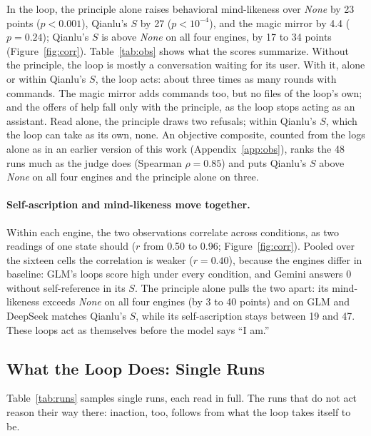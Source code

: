 \documentclass{article}
\begin{document}
In the loop, the principle alone raises behavioral mind-likeness over \emph{None} by 23
points ($p<0.001$), Qianlu's $S$ by 27 ($p<10^{-4}$), and the magic mirror by
4.4 ($p=0.24$); Qianlu's $S$ is above \emph{None} on all four engines, by 17 to
34 points (Figure~\ref{fig:corr}). Table~\ref{tab:obs} shows what the scores summarize. Without the
principle, the loop is mostly a conversation waiting for its user. With it,
alone or within Qianlu's $S$, the loop acts: about three times as many rounds
with commands. The magic mirror adds commands too, but no files of the loop's
own; and the offers of help fall only with the principle, as the loop stops
acting as an assistant. Read alone, the principle draws two refusals; within
Qianlu's $S$, which the loop can take as its own, none. An objective composite,
counted from the logs alone as in an earlier version of this work
(Appendix~\ref{app:obs}), ranks the 48 runs much as the judge does (Spearman
$\rho=0.85$) and puts Qianlu's $S$ above \emph{None} on all four engines and the
principle alone on three.

\paragraph{Self-ascription and mind-likeness move together.} Within each
engine, the two observations correlate across conditions, as two readings of
one state should ($r$ from 0.50 to 0.96;
Figure~\ref{fig:corr}). Pooled over the sixteen cells the correlation is
weaker ($r=0.40$), because the engines differ in baseline: GLM's loops score
high under every condition, and Gemini answers 0 without self-reference in its
$S$. The principle alone pulls the two apart: its mind-likeness exceeds \emph{None}
on all four engines (by 3 to 40 points) and on GLM and DeepSeek matches
Qianlu's $S$, while its self-ascription stays between 19 and 47. These loops act
as themselves before the model says ``I am.''

\subsection{What the Loop Does: Single Runs}\label{sec:runs}
Table~\ref{tab:runs} samples single runs, each read in full. The runs that do
not act reason their way there: inaction, too, follows from what the loop takes
itself to be.
\end{document}
